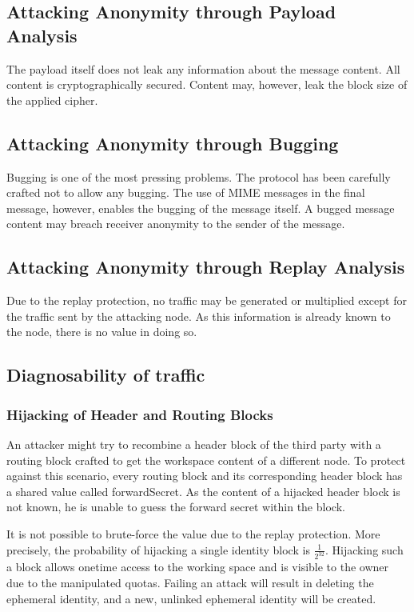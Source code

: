\subsection{Attacking Anonymity through Payload Analysis}
The payload itself does not leak any information about the message content. All content is cryptographically secured. Content may, however, leak the block size of the applied cipher.

\subsection{Attacking Anonymity through Bugging}
Bugging is one of the most pressing problems. The protocol has been carefully crafted not to allow any bugging. The use of MIME messages in the final message, however, enables the bugging of the message itself. A bugged message content may breach receiver anonymity to the sender of the message.

\subsection{Attacking Anonymity through Replay Analysis}
Due to the replay protection, no traffic may be generated or multiplied except for the traffic sent by the attacking node. As this information is already known to the node, there is no value in doing so. 

\subsection{Diagnosability of traffic}

\subsubsection{Hijacking of Header and Routing Blocks}
An attacker might try to recombine a header block of the third party with a routing block crafted to get the workspace content of a different node. To protect against this scenario, every routing block and its corresponding header block has a shared value called forwardSecret. As the content of a hijacked header block is not known, he is unable to guess the forward secret within the block.

It is not possible to brute-force the value due to the replay protection. More precisely, the probability of hijacking a single identity block is $\frac{1}{2^{32}}$. Hijacking such a block allows onetime access to the working space and is visible to the owner due to the manipulated quotas. Failing an attack will result in deleting the ephemeral identity, and a new, unlinked ephemeral identity will be created. 

